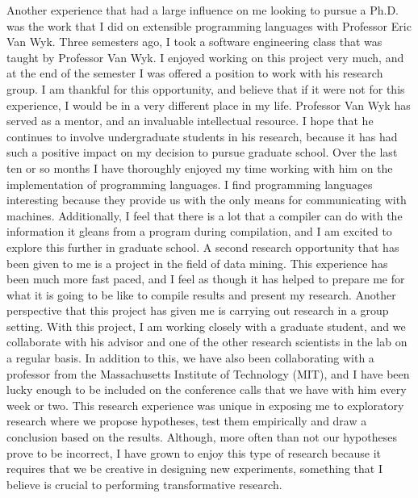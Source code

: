 \documentclass[a4paper,12pt]{article}
\newcommand{\tab}{\hspace*{2em}}
\begin{document}
\newline
\tab Another experience that had a large influence on me looking to pursue a Ph.D. was the work that I did on extensible programming languages with Professor Eric Van Wyk. Three semesters ago, I took a software engineering class that was taught by Professor Van Wyk. I enjoyed working on this project very much, and at the end of the semester I was offered a position to work with his research group. I am thankful for this opportunity, and believe that if it were not for this experience, I would be in a very different place in my life. Professor Van Wyk has served as a mentor, and an invaluable intellectual resource. I hope that he continues to involve undergraduate students in his research, because it has had such a positive impact on my decision to pursue graduate school. Over the last ten or so months I have thoroughly enjoyed my time working with him on the implementation of programming languages. I find programming languages interesting because they provide us with the only means for communicating with machines. Additionally, I feel that there is a lot that a compiler can do with the information it gleans from a program during compilation, and I am excited to explore this further in graduate school.\newline
\tab A second research opportunity that has been given to me is a project in the field of data mining.  This experience has been much more fast paced, and I feel as though it has helped to prepare me for what it is going to be like to compile results and present my research.  Another perspective that this project has given me is carrying out research in a group setting.  With this project, I am working closely with a graduate student, and we collaborate with his advisor and one of the other research scientists in the lab on a regular basis.  In addition to this, we have also been collaborating with a professor from the Massachusetts Institute of Technology (MIT), and I have been lucky enough to be included on the conference calls that we have with him every week or two. This research experience was unique in exposing me to exploratory research where we propose hypotheses, test them empirically and draw a conclusion based on the results. Although, more often than not our hypotheses prove to be incorrect, I have grown to enjoy this type of research because it requires that we be creative in designing new experiments, something that I believe is crucial to performing transformative research.\newline
\end{document}
